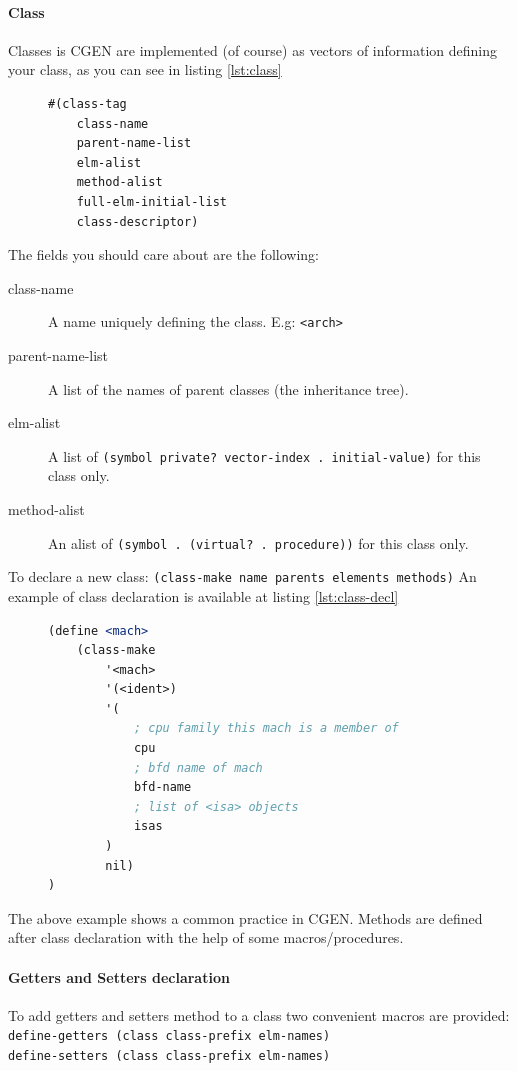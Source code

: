 \documentclass{article}
\begin{document}
\paragraph{Class}
Classes is CGEN are implemented (of course) as vectors of information defining your class, as you can see in listing \ref{lst:class}
\lstset{
	frame=single,
	numbers=left,
	upquote=true
}
\begin{figure}[H]
\begin{lstlisting}[language=Scheme, label=lst:class, caption=A class in CGEN looks like this]
#(class-tag
	class-name
	parent-name-list
	elm-alist
	method-alist
	full-elm-initial-list
	class-descriptor)
\end{lstlisting}
\end{figure}

The fields you should care about are the following:
\begin{description}
\item[class-name] A name uniquely defining the class. E.g: \texttt{<arch>}
\item[parent-name-list] A list of the names of parent classes (the inheritance tree).
\item[elm-alist] A list of \texttt{(symbol private? vector-index . initial-value)} for this class only.
\item[method-alist] An alist of \texttt{(symbol . (virtual? . procedure))} for this class only.
\end{description}

To declare a new class: \texttt{(class-make name parents elements methods)}
An example of class declaration is available at listing \ref{lst:class-decl}

\begin{figure}[H]
\begin{lstlisting}[language=Scheme, label=lst:class-decl, caption=An example of class declaration in CGEN]
(define <mach>
	(class-make 
		'<mach>
		'(<ident>)
		'(
			; cpu family this mach is a member of
			cpu
			; bfd name of mach
			bfd-name
			; list of <isa> objects
			isas
		)
		nil)
)
\end{lstlisting}
\end{figure}

The above example shows a common practice in CGEN. Methods are defined after class declaration with the help of some macros/procedures.

\paragraph{Getters and Setters declaration}
To add getters and setters method to a class two convenient macros are provided:\\
\texttt{define-getters (class class-prefix elm-names)} \\
\texttt{define-setters (class class-prefix elm-names)}
\end{document}
